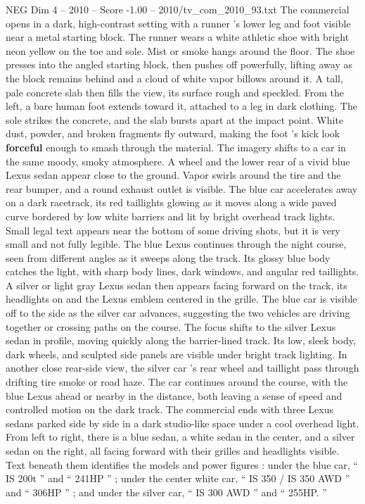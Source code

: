 \begin{textsample}{NEG Dim 4 – 2010 – Score -1.00 – 2010/tv\_com\_2010\_93.txt}  \label{ex:f4_neg_073}
The commercial opens in a dark, high-contrast setting with a runner ’s lower leg and foot visible near a metal starting block.
The runner wears a white athletic shoe with bright neon yellow on the toe and sole.
Mist or smoke hangs around the floor.
The shoe presses into the angled starting block, then pushes off powerfully, lifting away as the block remains behind and a cloud of white vapor billows around it.
A tall, pale concrete slab then fills the view, its surface rough and speckled.
From the left, a bare human foot extends toward it, attached to a leg in dark clothing.
The sole strikes the concrete, and the slab bursts apart at the impact point.
White dust, powder, and broken fragments fly outward, making the foot ’s kick look \textbf{forceful} enough to smash through the material.
The imagery shifts to a car in the same moody, smoky atmosphere.
A wheel and the lower rear of a vivid blue Lexus sedan appear close to the ground.
Vapor swirls around the tire and the rear bumper, and a round exhaust outlet is visible.
The blue car accelerates away on a dark racetrack, its red taillights glowing as it moves along a wide paved curve bordered by low white barriers and lit by bright overhead track lights.
Small legal text appears near the bottom of some driving shots, but it is very small and not fully legible.
The blue Lexus continues through the night course, seen from different angles as it sweeps along the track.
Its glossy blue body catches the light, with sharp body lines, dark windows, and angular red taillights.
A silver or light gray Lexus sedan then appears facing forward on the track, its headlights on and the Lexus emblem centered in the grille.
The blue car is visible off to the side as the silver car advances, suggesting the two vehicles are driving together or crossing paths on the course.
The focus shifts to the silver Lexus sedan in profile, moving quickly along the barrier-lined track.
Its low, sleek body, dark wheels, and sculpted side panels are visible under bright track lighting.
In another close rear-side view, the silver car ’s rear wheel and taillight pass through drifting tire smoke or road haze.
The car continues around the course, with the blue Lexus ahead or nearby in the distance, both leaving a sense of speed and controlled motion on the dark track.
The commercial ends with three Lexus sedans parked side by side in a dark studio-like space under a cool overhead light.
From left to right, there is a blue sedan, a white sedan in the center, and a silver sedan on the right, all facing forward with their grilles and headlights visible.
Text beneath them identifies the models and power figures : under the blue car, “ IS 200t ” and “ 241HP ” ; under the center white car, “ IS 350 / IS 350 AWD ” and “ 306HP ” ; and under the silver car, “ IS 300 AWD ” and “ 255HP. ”

\end{textsample}
